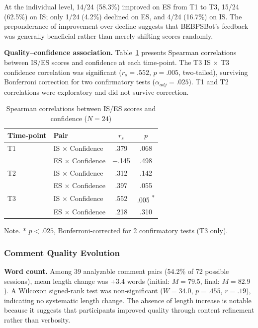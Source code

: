 \documentclass[]{llncs}
\begin{document}
At the individual level, 14/24 (58.3\%) improved on ES from T1 to T3, 
15/24 (62.5\%) on IS; only 1/24 (4.2\%) declined on ES, and 4/24 (16.7\%) 
on IS. The preponderance of improvement over decline suggests that 
BEBPSBot’s feedback was generally beneficial rather than merely shifting 
scores randomly. 

\textbf{Quality--confidence association.} Table~\ref{tab:correlations} 
presents Spearman correlations between IS/ES scores and confidence at 
each time-point. The T3 IS $\times$ T3 confidence correlation was 
significant ($r_s = .552$, $p = .005$, two-tailed), surviving 
Bonferroni correction for two confirmatory tests ($\alpha_{adj} = .025$). 
T1 and T2 correlations were exploratory and did not survive correction.
\begin{table}[htbp]
\centering
\caption{Spearman correlations between IS/ES scores and confidence ($N=24$)}
\label{tab:correlations}

\begin{threeparttable}
\begin{tabular}{llcc}
\hline
Time-point & Pair & $r_s$ & $p$ \\
\hline
T1 & IS $\times$ Confidence & .379 & .068 \\
   & ES $\times$ Confidence & $-$.145 & .498 \\
T2 & IS $\times$ Confidence & .312 & .142 \\
   & ES $\times$ Confidence & .397 & .055 \\
T3 & IS $\times$ Confidence & .552 & .005 \textsuperscript{*} \\
   & ES $\times$ Confidence & .218 & .310 \\
\hline
\end{tabular}
\begin{tablenotes}
\footnotesize
\item Note. * $p < .025$, Bonferroni-corrected for 2 confirmatory tests (T3 only).
\end{tablenotes}
\end{threeparttable}
\end{table}

\subsubsection{Comment Quality Evolution}
\textbf{Word count.} Among 39 analyzable comment pairs (54.2\% of 72 possible sessions), mean 
length change was +3.4 words (initial: $M = 79.5$, final: $M = 82.9$). 
A Wilcoxon signed-rank test was non-significant ($W = 34.0$, $p = .455$, 
$r = .19$), indicating no systematic length change. The absence of length 
increase is notable because it suggests that participants improved quality 
through content refinement rather than verbosity.
\end{document}
